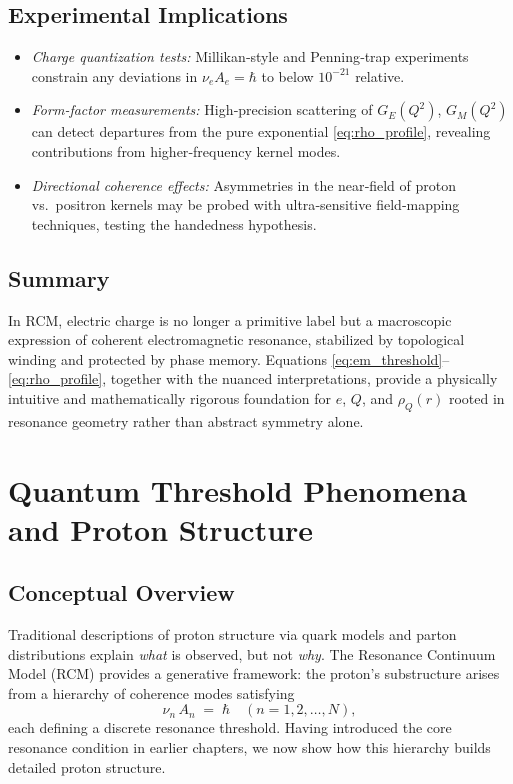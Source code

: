 \subsection{Experimental Implications}
\begin{itemize}
  \item \emph{Charge quantization tests:} Millikan‐style and Penning‐trap experiments constrain any deviations in \(\nu_eA_e=\hbar\) to below \(10^{-21}\) relative.  
  \item \emph{Form‐factor measurements:} High‐precision scattering of \(G_E(Q^2)\), \(G_M(Q^2)\) can detect departures from the pure exponential \eqref{eq:rho_profile}, revealing contributions from higher‐frequency kernel modes.  
  \item \emph{Directional coherence effects:} Asymmetries in the near‐field of proton vs.\ positron kernels may be probed with ultra‐sensitive field‐mapping techniques, testing the handedness hypothesis.
\end{itemize}

\subsection{Summary}
In RCM, electric charge is no longer a primitive label but a macroscopic expression of coherent electromagnetic resonance, stabilized by topological winding and protected by phase memory.  Equations \eqref{eq:em_threshold}–\eqref{eq:rho_profile}, together with the nuanced interpretations, provide a physically intuitive and mathematically rigorous foundation for \(e\), \(Q\), and \(\rho_Q(r)\) rooted in resonance geometry rather than abstract symmetry alone.

\section{Quantum Threshold Phenomena and Proton Structure}

\subsection{Conceptual Overview}
Traditional descriptions of proton structure via quark models and parton distributions explain {\it what} is observed, but not {\it why}.  The Resonance Continuum Model (RCM) provides a generative framework: the proton’s substructure arises from a hierarchy of coherence modes satisfying
\begin{equation}\label{eq:mode_coherence}
\nu_n\,A_n \;=\;\hbar
\quad(n=1,2,\dots,N),
\end{equation}
each defining a discrete resonance threshold.  Having introduced the core resonance condition in earlier chapters, we now show how this hierarchy builds detailed proton structure.

